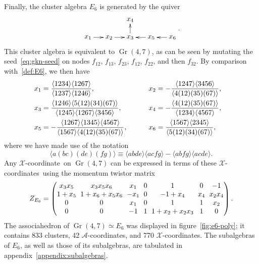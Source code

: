 \documentclass[11pt]{article}
\DeclareMathOperator{\Gr}{Gr}
\def\ket#1{\langle #1 \rangle}
\def\xcoord{$\mathcal{X}$-coordinate}
\def\xcoords{$\mathcal{X}$-coordinates}
\def\acoords{$\mathcal{A}$-coordinates}
\begin{document}
Finally, the cluster algebra $E_6$ is generated by the quiver
\begin{equation}\label{def:E6}
    \begin{gathered}
    \begin{xy} 0;<1pt,0pt>:<0pt,-1pt>::
      (0,0) *+{x_1} ="1",
      (30,0) *+{x_2} ="2",
      (60,0) *+{x_3} ="3",
      (60,-25) *+{x_4} ="4",
      (90,0) *+{x_5} ="5",
      (120,0) *+{x_6} ="6",
      "1", {\ar"2"},
      "2", {\ar"3"},
      "3", {\ar"4"},
      "5", {\ar"3"},
      "6", {\ar"5"},
    \end{xy}
    \end{gathered} .
\end{equation}
This cluster algebra is equivalent to $\Gr(4,7)$, as can be seen by mutating the seed~\eqref{eq:gkn-seed} on nodes $f_{12}$, $f_{13}$, $f_{23}$, $f_{12}$, $f_{22}$, and then $f_{32}$. By comparison with~\eqref{def:E6}, we then have 
\begin{align} \label{eq:E6_x_def}
x_1 &= \frac{\ket{1234}\ket{1267}}{\ket{1237} \ket{1246}}, \hspace{13.03ex} \quad \quad 
x_2 = - \frac{\ket{1247} \ket{3456}}{\ket{4(12)(35)(67)}}, \quad \nonumber \\
x_3 &= \frac{\ket{1246} \ket{5(12)(34)(67)}}{\ket{1245} \ket{1267} \ket{3456}}, \hspace{4.12ex} \quad \quad 
x_4 = -\frac{\ket{4(12)(35)(67)}}{\ket{1234} \ket{4567}}, \quad \\
x_5 &= -\frac{\ket{1267} \ket{1345}\ket{4567}}{\ket{1567}\ket{4(12)(35)(67)}}, \quad \quad \quad 
x_6 = \frac{\ket{1567}\ket{2345}}{\ket{5(12)(34)(67)}}, \quad \nonumber
\end{align}
where we have made use of the notation
\begin{equation} \label{eq:twistor_intersection}
\ket{a(bc)(de)(fg)} \equiv \ket{abde}\ket{acfg}-\ket{abfg}\ket{acde}.
\end{equation}
Any \xcoord\ on $\Gr(4,7)$ can be expressed in terms of these \xcoords\ using the momentum twistor matrix 
\begin{equation}
Z_{E_6} = 
\begingroup
\setlength\arraycolsep{3pt}
\begin{pmatrix} 
 x_3 x_5 & x_3 x_5 x_6 & x_1 & 0 & 1 & 0 & -1 \\
 1+x_5 & 1 + x_6 + x_5 x_6 & -x_1 & 0 & -1+x_4 & x_4 & x_2 x_4 \\
 0 & 0 & x_1 & 0 & 1 & 1 & x_2 \\
 0 & 0 & -1 & 1 & 1+x_2+x_2 x_3 & 1 & 0 \\
\end{pmatrix} .
\endgroup
\end{equation}
The associahedron of $\Gr(4,7) \simeq E_6$ was displayed in figure~\ref{fig:e6-poly}; it contains 833 clusters, 42 \acoords, and 770 \xcoords. The subalgebras of $E_6$, as well as those of its subalgebras, are tabulated in appendix~\ref{appendix:subalgebras}.
\end{document}
